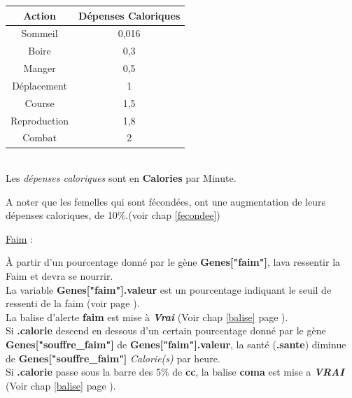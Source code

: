 \documentclass[french]{report}
\begin{document}
\begin{center}\label{depense_calorique}
\begin{tabular}{|c|c|}\hline
\rowcolor{yellow}\textbf{Action} & \textbf{Dépenses Caloriques}\\ \hline
Sommeil & 0,016 \\ \hline
Boire & 0,3 \\ \hline
Manger  & 0,5 \\ \hline
Déplacement & 1 \\ \hline
Course & 1,5 \\ \hline
Reproduction & 1,8 \\ \hline
Combat & 2 \\ \hline
\end{tabular}\\[0.5cm]

Les \textit{dépenses caloriques} sont en \textbf{Calories} par Minute.

\end{center}

A noter que les femelles qui sont fécondées, ont une augmentation de leurs dépenses caloriques, de 10\%.(voir chap \ref{fecondee})\\
\begin{center}
	\underline{Faim} :\label{faim}
\end{center}
À partir d'un pourcentage donné par le gène \textbf{Genes["faim"]}, la\CoCiX va  ressentir la Faim et devra se nourrir.\\

La variable \textbf{Genes["faim"].valeur} est un pourcentage indiquant le seuil de ressenti de la faim (voir page \pageref{liste_gene}).\\
La balise d'alerte \textbf{faim} est mise à \textbf{\textit{Vrai}} (Voir chap \ref{balise} page \pageref{balise}).\\

Si \textbf{.calorie} descend en dessous d'un certain pourcentage donné par le gène \textbf{Genes["souffre\_faim"]} de \textbf{Genes["faim"].valeur}, la santé (\textbf{.sante}) diminue de \textbf{Genes["souffre\_faim"]} \textit{Calorie(s)} par heure.\\

Si \textbf{.calorie} passe sous la barre des 5\% de \textbf{cc}, la balise \textbf{coma} est mise a \textbf{\textit{VRAI}} (Voir chap \ref{balise} page \pageref{balise}).\\
\end{document}
